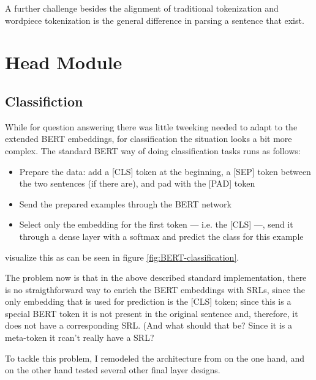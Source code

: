 A further challenge besides the alignment of traditional tokenization and wordpiece tokenization is
the general difference in parsing a sentence that exist.

\section{Head Module}


\subsection{Classifiction}

While for question answering there was little tweeking needed to adapt to the extended BERT
embeddings, for classification the situation looks a bit more complex. The standard BERT way
of doing classification tasks runs as follows:

\begin{itemize}
  \item Prepare the data: add a [CLS] token at the beginning, a [SEP] token between the two sentences (if there are), and pad with the [PAD] token
  \item Send the prepared examples through the BERT network
  \item Select only the embedding for the first token  --- i.e. the [CLS] ---, send it through a dense layer with a softmax and predict the class for this example
\end{itemize}

\cite{devlin2018bert} visualize this as can be seen in figure \ref{fig:BERT-classification}.



The problem now is that in the above described standard implementation, there
is no straigthforward way to enrich the BERT embeddings with SRLs, since the
only embedding that is used for prediction is the [CLS] token; since this is a
special BERT token it is not present in the original sentence and, therefore,
it does not have a corresponding SRL. (And what should that be? Since it is a
meta-token it rcan't really have a SRL?

To tackle this problem, I remodeled the architecture from \cite{zhang2019semantics} on the one
hand, and on the other hand tested several other final layer designs.

